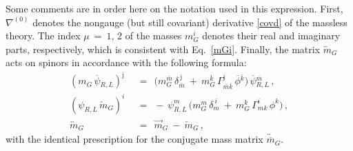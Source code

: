 \documentclass[12pt]{article}
\newcommand{\ov}{\overline}
\newcommand{\bpsi}{\ov{\psi}{}}
\newcommand{\bphi}{\ov{\phi}{}}
\newcommand{\bj}{{\bar \jmath}}
\newcommand{\bk}{{\bar k}}
\newcommand{\bm}{{\bar m}}
\begin{document}
	Some comments are in order here on the notation used in this expression. First,
	  $ \nabla^{(0)} $ denotes the nongauge (but still covariant) derivative \eqref{covd}
	of the massless theory.
	The index $ \mu ~=~ 1,\, 2$ of the masses $ m_G^i $ denotes their real and imaginary parts, respectively,
	which is consistent with Eq.~\eqref{mGi}.
	Finally, the matrix $ \overleftrightarrow{m}{}_{\!G} $ acts on   spinors in accordance with
	the following formula:
\begin{align*}
%
	(m_G\, \bpsi_{R,L})^\bj & ~~=~~ 
		\bigl( m_G^\bm\, \delta_{\bm}^{~\bj} ~+~ m_G^\bk\, \Gamma^\bj_{\bm\bk}\, \bphi^\bk \bigr)\, \bpsi_{R,L}^\bm\,,
	\\[2mm]
%
	(\psi_{R,L}\,\overleftarrow{m}{}_{\!G})^i & ~~=~~
		-\, \psi_{R,L}^m\, \bigl( m_G^m\, \delta_m^{~i} ~+~ m_G^k\, \Gamma^i_{mk}\, \phi^k \bigr)\,,
	\\[2mm]
%
	\overleftrightarrow{m}{}_{\!G} & ~~=~~ \overrightarrow{m}{}_{\!G} ~-~ \overleftarrow{m}{}_{\!G}\,,
\end{align*}
	with the identical prescription for the conjugate mass matrix $ \overleftrightarrow{\ov{m}}{}_{\!G} $.
\end{document}
